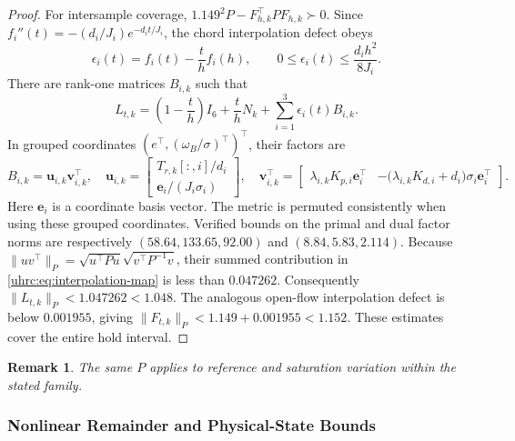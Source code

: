 \documentclass[12pt, a4paper]{article}
\newtheorem{remark}{Remark}
\begin{document}
\begin{proof}
For intersample coverage, 
$1.149^2P-F_{h,k}^\top PF_{h,k}\succ0$.
Since $f_i''(t)=-(d_i/J_i)e^{-d_it/J_i}$, the chord interpolation defect obeys
\begin{equation}
 \epsilon_i(t)=f_i(t)-\frac th f_i(h),\qquad
 0\le\epsilon_i(t)\le\frac{d_i h^2}{8J_i}.
 \label{uhrc:eq:interpolation}
\end{equation}
There are rank-one matrices $B_{i,k}$ such that
\begin{equation}
 L_{t,k}=\left(1-\frac th\right)I_6+\frac thN_k+
                 \sum_{i=1}^3\epsilon_i(t)B_{i,k}.
 \label{uhrc:eq:interpolation-map}
\end{equation}
In grouped coordinates $(e^\top,(\omega_B/\sigma)^\top)^\top$, their factors are
\begin{equation}
 B_{i,k}=\mathbf u_{i,k}\mathbf v_{i,k}^{\top},\quad
 \mathbf u_{i,k}=\begin{bmatrix}T_{r,k}[:,i]/d_i\\\mathbf e_i/(J_i\sigma_i)\end{bmatrix},\quad
 \mathbf v_{i,k}^{\top}=\begin{bmatrix}
 \lambda_{i,k}K_{p,i}\mathbf e_i^\top&
 -\bigl(\lambda_{i,k}K_{d,i}+d_i\bigr)\sigma_i\mathbf e_i^\top
 \end{bmatrix}.
 \label{uhrc:eq:rank-one}
\end{equation}
Here $\mathbf e_i$ is a coordinate basis vector. The metric is permuted
consistently when using these grouped coordinates. Verified bounds on the
primal and dual factor norms are respectively
$(58.64,133.65,92.00)$ and $(8.84,5.83,2.114)$.
Because $\|uv^\top\|_P=\sqrt{u^\top Pu}\sqrt{v^\top P^{-1}v}$,
their summed contribution in \eqref{uhrc:eq:interpolation-map} is less than
$0.047262$. Consequently $\|L_{t,k}\|_P<1.047262<1.048$.
The analogous open-flow interpolation defect is below $0.001955$, giving
$\|F_{t,k}\|_P<1.149+0.001955<1.152$.
These estimates cover the entire hold interval.
\end{proof}

\begin{remark}
The same $P$ applies to reference and saturation variation within the stated
family.
\end{remark}

\subsubsection{Nonlinear Remainder and Physical-State Bounds}
\label{uhrc:sec:residual}
\end{document}
